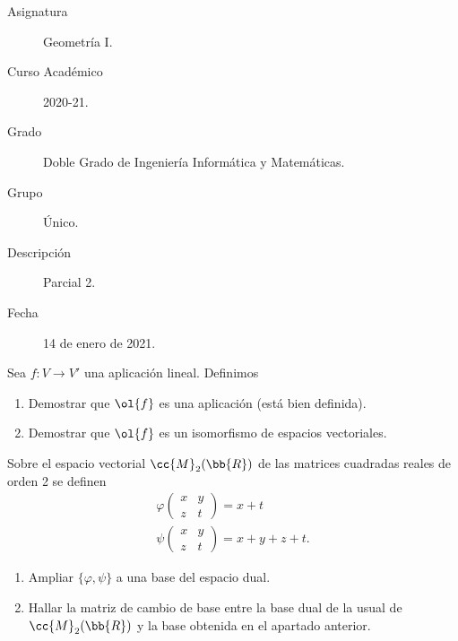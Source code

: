 \documentclass[12pt]{article}
\begin{document}
	
	\newcommand{\R}{{\mathbb{R}}} %
	\newcommand{\K}{{\mathbb{K}}} %
	
	
	
	\begin{description}
		\item[Asignatura] Geometría I.
		\item[Curso Académico] 2020-21.
		\item[Grado] Doble Grado de Ingeniería Informática y Matemáticas.
		\item[Grupo] Único.
		\item[Descripción] Parcial 2.
		\item[Fecha] 14 de enero de 2021.    
	\end{description}
	\newpage

	\begin{ejercicio}
		Sea $f : V \to V'$ una aplicación lineal. Definimos
		\begin{enumerate}
			\item Demostrar que $\ol{f}$ es una aplicación (está bien definida).
			\item Demostrar que $\ol{f}$ es un isomorfismo de espacios vectoriales.
		\end{enumerate}
	\end{ejercicio}

	\begin{ejercicio}
		Sobre el espacio vectorial $\cc{M}_2(\bb{R})$ de las matrices cuadradas reales de orden 2 se definen
		\begin{gather*}
			\varphi\left(\begin{array}{cc}
				x & y \\
				z & t
			\end{array}\right) = x + t \\
			\psi\left(\begin{array}{cc}
				x & y \\
				z & t
			\end{array}\right) = x + y + z + t.
		\end{gather*}
		\begin{enumerate}
			\item Ampliar $\{\varphi, \psi\}$ a una base del espacio dual.
			\item Hallar la matriz de cambio de base entre la base dual de la usual de $\cc{M}_2(\bb{R})$ y la base obtenida en el apartado anterior.
		\end{enumerate}
	\end{ejercicio}
	
\end{document}
